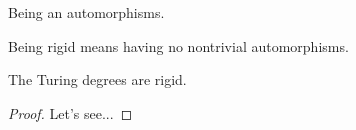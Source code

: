 %

\begin{definition}
	\label{def:auto}
	\leanok
	Being an automorphisms.
\end{definition}
\begin{definition}
	\label{def:rigid}
	\leanok
	Being rigid means having no nontrivial automorphisms.
\end{definition}


\begin{theorem}
	\label{thm:rigid}
	\notready
	The Turing degrees are rigid.
\end{theorem}
\begin{proof}
	Let's see...
\end{proof}